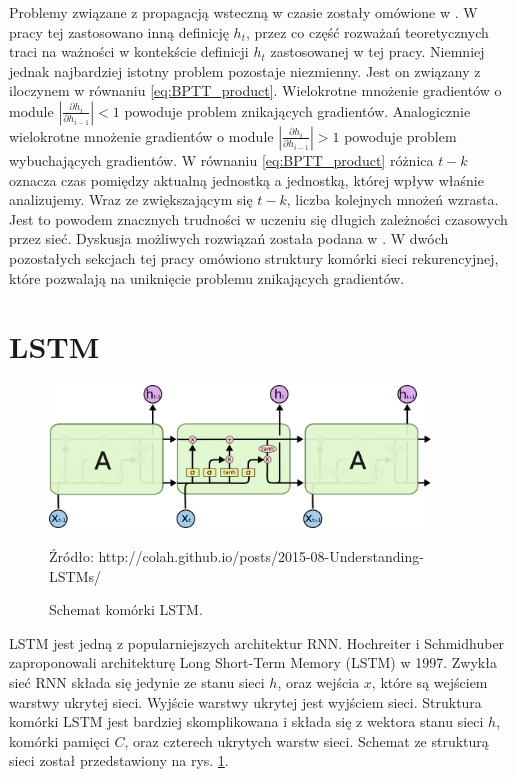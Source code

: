 \documentclass[oneside, mag]{mgr}
\begin{document}
Problemy związane z propagacją wsteczną w czasie zostały omówione w \cite{DBLP:journals/corr/abs-1211-5063}. W pracy tej zastosowano inną definicję $h_t$, przez co część rozważań teoretycznych traci na ważności w kontekście definicji $h_t$ zastosowanej w tej pracy. Niemniej jednak najbardziej istotny problem pozostaje niezmienny. Jest on związany z iloczynem w równaniu \ref{eq:BPTT_product}. Wielokrotne mnożenie gradientów o module $|\frac{\partial h_i}{\partial h_{i-1}}| < 1$ powoduje problem znikających gradientów. Analogicznie wielokrotne mnożenie gradientów o module $|\frac{\partial h_i}{\partial h_{i-1}}| > 1$ powoduje problem wybuchających gradientów. W równaniu \ref{eq:BPTT_product} różnica $t - k$ oznacza czas pomiędzy aktualną jednostką a jednostką, której wpływ właśnie analizujemy. Wraz ze zwiększającym się $t - k$, liczba kolejnych mnożeń wzrasta. Jest to powodem znacznych trudności w uczeniu się długich zależności czasowych przez sieć.  Dyskusja możliwych rozwiązań została podana w \cite{DBLP:journals/corr/abs-1211-5063}. W dwóch pozostałych sekcjach tej pracy omówiono struktury komórki sieci rekurencyjnej, które pozwalają na uniknięcie problemu znikających gradientów. 


\section{LSTM}

\begin{figure}
\centering
	\includegraphics[width=0.90\textwidth]{img/lstm_colah.png}
	\caption{Schemat komórki LSTM.} Źródło: http://colah.github.io/posts/2015-08-Understanding-LSTMs/
	\label{fig:lstm}
\end{figure}

LSTM jest jedną z popularniejszych architektur RNN. Hochreiter i Schmidhuber zaproponowali architekturę Long Short-Term Memory (LSTM) \cite{LSTM} w 1997. Zwykła sieć RNN składa się jedynie ze stanu sieci $h$, oraz wejścia $x$, które są wejściem warstwy ukrytej sieci. Wyjście warstwy ukrytej jest wyjściem sieci. Struktura komórki LSTM jest bardziej skomplikowana i składa się z wektora stanu sieci $h$, komórki pamięci $C$, oraz czterech ukrytych warstw sieci. Schemat ze strukturą sieci został przedstawiony na rys. \ref{fig:lstm}.
\end{document}
